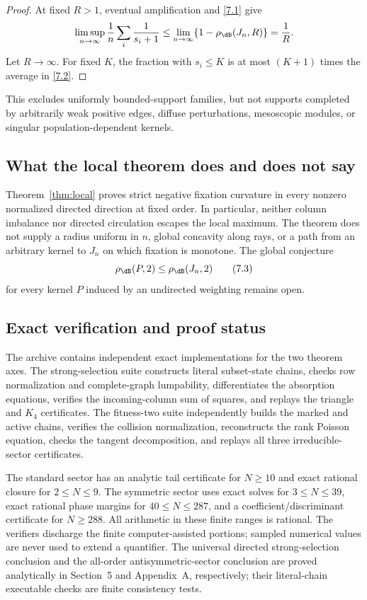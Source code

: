 \begin{proof}
At fixed $R>1$, eventual amplification and \eqref{7.1} give
\[
 \limsup_{n\to\infty}\frac1n\sum_i\frac1{s_i+1}
 \le\lim_{n\to\infty}\{1-\rho_{\dB}(J_n,R)\}=\frac1R.
\]
Let $R\to\infty$.  For fixed $K$, the fraction with $s_i\le K$ is at most
$(K+1)$ times the average in \eqref{7.2}.
\end{proof}

This excludes uniformly bounded-support families, but not supports completed
by arbitrarily weak positive edges, diffuse perturbations, mesoscopic
modules, or singular population-dependent kernels.

\subsection{What the local theorem does and does not say}

Theorem~\ref{thm:local} proves strict negative fixation curvature in every
nonzero normalized directed direction at fixed order.  In particular,
neither column imbalance nor directed circulation escapes the local maximum.
The theorem does not supply a radius uniform in $n$, global concavity along
rays, or a path from an arbitrary kernel to $J_n$ on which fixation is monotone.  The
global conjecture
\[
 \rho_{\dB}(P,2)\le\rho_{\dB}(J_n,2)                         \tag{7.3}\label{7.3}
\]
for every kernel $P$ induced by an undirected weighting remains open.

\subsection{Exact verification and proof status}

The archive contains independent exact implementations for the two theorem
axes.  The strong-selection suite constructs literal subset-state chains,
checks row normalization and complete-graph lumpability, differentiates the
absorption equations, verifies the incoming-column sum of squares, and
replays the triangle and $K_4$ certificates.  The fitness-two suite
independently builds the marked and active chains, verifies the collision
normalization, reconstructs the rank Poisson equation, checks the tangent
decomposition, and replays all three irreducible-sector certificates.

The standard sector has an analytic tail certificate for $N\ge10$ and exact
rational closure for $2\le N\le9$.  The symmetric sector uses exact solves
for $3\le N\le39$, exact rational phase margins for $40\le N\le287$, and a
coefficient/discriminant certificate for $N\ge288$.  All arithmetic in these
finite ranges is rational.  The verifiers discharge the finite
computer-assisted portions; sampled numerical values are never used to
extend a quantifier.
The universal directed strong-selection conclusion and the all-order
antisymmetric-sector conclusion are proved analytically in Section~5 and
Appendix~A, respectively; their literal-chain executable checks are finite
consistency tests.

